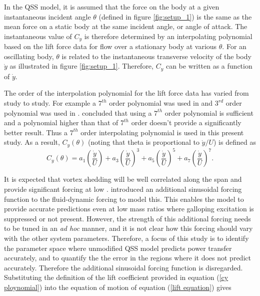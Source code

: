 

In the QSS model, it is assumed that the force on the body at a given instantaneous incident angle $\theta$ (defined in figure \ref{fig:setup_1}) is the same as the mean force on a static body at the same incident angle, or angle of attack. The instantaneous value of $C_y$ is therefore determined by an interpolating polynomial based on the lift force data for flow over a stationary body at various $\theta$. For an oscillating body, $\theta$ is related to the  instantaneous transverse velocity of the body $\dot{y}$ as illustrated in figure \ref{fig:setup_1}. Therefore, $C_y$ can be written as a function of $\dot{y}$.

The order of the interpolation polynomial for the lift force data has varied from study to study. For  example a $7^{th}$ order polynomial was used in \cite{Parkinson1964} and $3^{rd}$ order polynomial was used in \cite{Barrero-Gil2009}. \cite{Ng2005} concluded that using a $7^{th}$ order polynomial is sufficient and a polynomial higher than that of $7^{th}$ order doesn't provide a significantly better result. Thus a $7 ^{th}$ order interpolating polynomial is used in this present study. As a result, $C_y(\theta)$ (noting that theta is proportional to $\dot{y}/U$) is defined as
\begin{equation}
\label{cy ploynomial}
C_y(\theta)=a_1\left(\frac{\dot{y}}{U}\right)+a_3\left(\frac{\dot{y}}{U}\right)^3+a_5\left(\frac{\dot{y}}{U}\right)^5+a_7\left(\frac{\dot{y}}{U}\right)^7.
\end{equation}


 It is expected that vortex shedding will be well correlated along the span and provide significant forcing at low \reynoldsnumber. \citet{Joly2012} introduced  an additional sinusoidal forcing function to the fluid-dynamic forcing to model this. This enables the model to provide accurate predictions even at low mass ratios where galloping excitation is suppressed or not present. However, the strength of this additional forcing needs to be tuned in an \emph{ad hoc} manner, and it is not clear how this forcing should vary with the other system parameters. Therefore, a focus of this study is to identify the parameter space where unmodified QSS model predicts power transfer accurately, and to quantify the the error in the regions where it does not predict accurately. Therefore the additional sinusoidal forcing function is disregarded. Substituting the definition of the lift coefficient provided in equation (\ref{cy ploynomial}) into the equation of motion of equation (\ref{lift equation}) gives 
 
